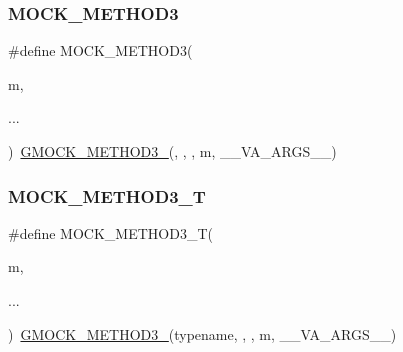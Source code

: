 \mbox{\label{_obj__test_2lib_2googletest-release-1_88_81_2googlemock_2include_2gmock_2gmock-generated-function-mockers_8h_af11ebf7fafb231778846dba77725cfdd}} 
\subsubsection{\texorpdfstring{MOCK\_METHOD3}{MOCK\_METHOD3}}
{\footnotesize\ttfamily \#define M\+O\+C\+K\+\_\+\+M\+E\+T\+H\+O\+D3(\begin{DoxyParamCaption}\item[{}]{m,  }\item[{}]{... }\end{DoxyParamCaption})~\mbox{\hyperlink{_obj__test_2lib_2googletest-release-1_88_81_2googlemock_2include_2gmock_2gmock-generated-function-mockers_8h_af7c77ba511c631de02bb8c45a6ed3045}{G\+M\+O\+C\+K\+\_\+\+M\+E\+T\+H\+O\+D3\+\_\+}}(, , , m, \+\_\+\+\_\+\+V\+A\+\_\+\+A\+R\+G\+S\+\_\+\+\_\+)}

\mbox{\label{_obj__test_2lib_2googletest-release-1_88_81_2googlemock_2include_2gmock_2gmock-generated-function-mockers_8h_a0b1576f68e6161f106e3d9ee7e3ac28b}} 
\subsubsection{\texorpdfstring{MOCK\_METHOD3\_T}{MOCK\_METHOD3\_T}}
{\footnotesize\ttfamily \#define M\+O\+C\+K\+\_\+\+M\+E\+T\+H\+O\+D3\+\_\+T(\begin{DoxyParamCaption}\item[{}]{m,  }\item[{}]{... }\end{DoxyParamCaption})~\mbox{\hyperlink{_obj__test_2lib_2googletest-release-1_88_81_2googlemock_2include_2gmock_2gmock-generated-function-mockers_8h_af7c77ba511c631de02bb8c45a6ed3045}{G\+M\+O\+C\+K\+\_\+\+M\+E\+T\+H\+O\+D3\+\_\+}}(typename, , , m, \+\_\+\+\_\+\+V\+A\+\_\+\+A\+R\+G\+S\+\_\+\+\_\+)}

